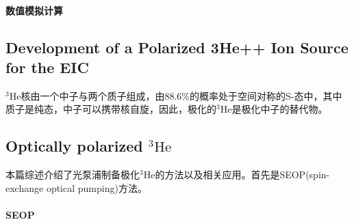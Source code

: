\documentclass{article}
\numberwithin{equation}{subsection} %
\numberwithin{figure}{subsection} %
\numberwithin{table}{subsection} %
\begin{document}
\paragraph{数值模拟计算}


\subsection{Development of a Polarized 3He++ Ion Source for  the EIC \cite{musgrave_development_2020}}

$^3\text{He}$核由一个中子与两个质子组成，由88.6\%的概率处于空间对称的S-态中，其中质子是纯态，中子可以携带核自旋，因此，极化的$^3\text{He}$是极化中子的替代物。


\subsection{Optically polarized $^{3}\mathrm{He}$ \cite{gentile_optically_2017}}

本篇综述介绍了光泵浦制备极化$^3\mathrm{He}$的方法以及相关应用。首先是SEOP(spin-exchange optical pumping)方法。

\paragraph{SEOP}



















\newpage
{}


\end{document}
